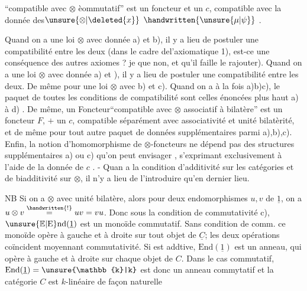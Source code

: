 
``compatible avec $\otimes$ èommutatif'' est un foncteur et un $c$, compatible avec la donnée des$\unsure{\otimes|\deleted{x}}$ $\handwritten{\unsure{\mu|\psi}}$ .

Quand on a une loi $\otimes$ avec donnée a) et b), il y a lieu de postuler une compatibilité entre les deux (dans le cadre del'axiomatique 1), est-ce une conséquence des autres axiomes ? je  que non, et qu'il faille le rajouter). Quand on a une loi $\otimes$ avec donnée a) et ), il y a lieu de postuler une compatibilité entre les deux. De même pour une loi $\otimes$ avec b) et c). Quand on a à la fois a)b)c), le paquet  de toutes les conditions de compatibilité sont celles énoncées plus haut  a) à d) . De même, un Foncteur``compatible avec $\otimes$ associatif à  bilatère'' est un foncteur $F$, $+$ un $c$, compatible séparément avec associativité et unité bilatèrité, et de même pour tout autre paquet de données supplémentaires parmi a),b),c). Enfin, la notion d'homomorphisme de  $\otimes$-foncteurs ne dépend pas des structures supplémentaires a) ou c) qu'on peut envisager , s'exprimant exclusivement à l'aide de la donnée de $c$\deleted{\unsure{)}} . - Quan a la  condition d'additivité sur les catégories et de biadditivité sur $\otimes$, il n'y a lieu de l'introduire qu'en dernier lieu.

 NB Si on a $\otimes$ avec unité bilatère, alors pour deux endomorphismes $u,v$ de $\underline{1}$, on a $u\otimes v\overset{\handwritten{!}}{=}uv=vu$. Donc sous la condition de commutativité c), $\unsure{\mathbb{E}|\mathrm{E}}\mathrm{nd}(\underline{1})$ est un monoïde commutatif.  Sans condition de comm. ce monoïde opère à gauche et à droite sur tout objet de $\underline{C}$; les deux opérations coïncident moyennant commutativité. Si  est addtive, $\mathrm{End}(\underline{1})$ est un anneau, qui opère à gauche et à droite sur chaque objet de $C$. Dans le cas commutatif, $\mathrm{End}(\underline{1})=\unsure{\mathbb{k}|k}$ est donc un anneau commytatif et la catégorie $C$ est $k$-linéaire de façon naturelle
